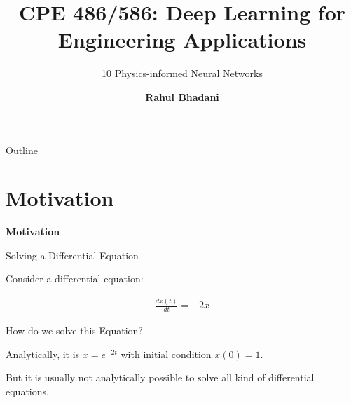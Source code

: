 \documentclass[aspectratio=169,xcolor=dvipsnames,svgnames,x11names,fleqn]{beamer}
\title[CPE 487/587: Deep Learning]{CPE 486/586: Deep Learning for Engineering Applications} %
\subtitle{10 Physics-informed Neural Networks}
\author[Rahul Bhadani] {{\Large \textbf{Rahul Bhadani}}}
\institute[UAH] %
{
    Electrical \& Computer Engineering,  The University of Alabama in Huntsville
}
\date
\begin{document}
\begin{frame}
    \titlepage
\end{frame}

\begin{frame}{Outline}
    \backgroundtableofcontents
\end{frame}

\section{Motivation}


\begin{frame}{}
    \begin{center}
    \huge \bf \color{DarkBlue}
    Motivation        
\end{center}
\end{frame}

\begin{frame}{Solving a Differential Equation}

\begin{tcolorbox}[    enhanced,
    colback=springBlossom,
    colframe=borderLine,
    arc=0pt, 
    boxrule=0.3pt,
    leftrule=3pt,
    borderline west={5pt}{0pt}{accentOrange}, 
    fontupper=\color{boxBackground},
    pad at break*=0mm,
    top=5pt, bottom=5pt, left=5pt, right=5pt]
    
   Consider a differential equation:
   
   \begin{align*}
   \frac{dx(t)}{dt} = -2x
   \end{align*}

\end{tcolorbox}

How do we solve this Equation?   

\pause 

\vspace{10pt}

Analytically, it is $x = e^{-2t}$ with initial condition $x(0) = 1$.

\pause 

\begin{center}
\Large 

\color{androidRed} But it is usually not analytically possible to solve all kind of differential equations.
\end{center}

\end{frame}
\end{document}
